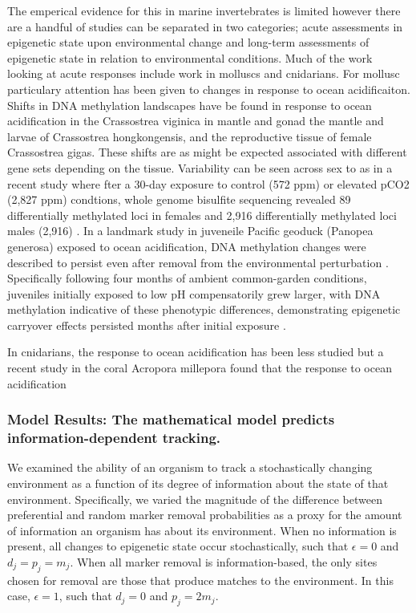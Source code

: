 \documentclass{article}
\begin{document}
The emperical evidence for this in marine invertebrates is limited however there are a handful of studies can be separated in two categories; acute assessments in epigenetic state upon environmental change and long-term assessments of epigenetic state in relation to environmental conditions. Much of the work looking at acute responses include work in molluscs and cnidarians. For mollusc particulary attention has been given to changes in response to ocean acidificaiton. Shifts in DNA methylation landscapes have be found in response to ocean acidification in the Crassostrea viginica in mantle \cite{10.3389/fmars.2020.566419} and gonad \cite{0.3389/fmars.2020.00225} the mantle \cite{10.1111/gcb.15675} and larvae \cite{10.1016/j.marenvres.2020.105217, 10.1111/mec.16751} of Crassostrea hongkongensis, and the reproductive tissue \cite{10.1186/s12864-022-08781-5} of female Crassostrea gigas. These shifts are as might be expected associated with different gene sets depending on the tissue. Variability can be seen across sex to as in a recent study where fter a 30-day exposure to control (572 ppm) or elevated pCO2 (2,827 ppm) condtions, whole genome bisulfite sequencing revealed 89 differentially methylated loci in females and 2,916 differentially methylated loci males (2,916) \cite{10.1101/2024.04.04.588108}. In a landmark study in juveneile Pacific geoduck (Panopea generosa) exposed to ocean acidification, DNA methylation changes were described to persist even after removal from the environmental perturbation \cite{10.1101/2022.06.24.497506}. Specifically following four months of ambient common-garden conditions, juveniles initially exposed to low pH compensatorily grew larger, with DNA methylation indicative of these phenotypic differences, demonstrating epigenetic carryover effects persisted months after initial exposure \cite{10.1101/2022.06.24.497506}. 


In cnidarians, the response to ocean acidification has been less studied but a recent study in the coral Acropora millepora found that the response to ocean acidification



\subsubsection{Model Results: The mathematical model predicts information-dependent tracking.}
We examined the ability of an organism to track a stochastically changing environment as a function of its degree of information about the state of that environment. Specifically, we varied the magnitude of the difference between preferential and random marker removal probabilities as a proxy for the amount of information an organism has about its environment. When no information is present, all changes to epigenetic state occur stochastically, such that $\epsilon = 0$ and $d_j = p_j = m_j$. When all marker removal is information-based, the only sites chosen for removal are those that produce matches to the environment. In this case, $\epsilon = 1$, such that $d_j = 0$ and $p_j = 2m_j$. 
\end{document}
